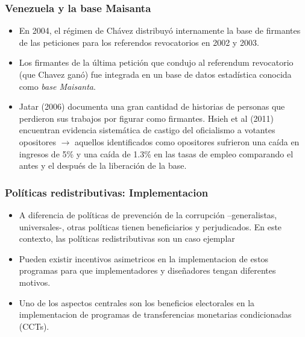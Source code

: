 \documentclass[handout,final,xcolor=dvipsnames]{beamer}
\begin{document}
   \begin{frame}\frametitle{Venezuela y la base Maisanta}
  \begin{itemize}\itemsep 10pt
      \item En 2004, el régimen de Chávez distribuyó internamente la
        base de firmantes de las peticiones para los referendos
        revocatorios en 2002 y 2003.
        \item Los firmantes de la última petición que condujo al
          referendum revocatorio (que Chavez ganó) fue integrada en un
          base de datos estadística conocida como \textit{base
            Maisanta}.
          \item Jatar (2006) documenta una gran cantidad de historias
            de personas que perdieron sus trabajos por figurar como
            firmantes. Hsieh et al (2011) encuentran evidencia
            sistemática de castigo del oficialismo a votantes
            opositores $\longrightarrow$ aquellos identificados como
            opositores sufrieron una caída en ingresos de 5\% y una
            caída de 1.3\% en las tasas de empleo comparando el antes
            y el después de la liberación de la base. 
     \end{itemize}
  \end{frame}



  \begin{frame}\frametitle{Políticas redistributivas: Implementacion}
  \begin{itemize}\itemsep 10pt
  \item A diferencia de políticas de prevención de la corrupción
    --generalistas, universales-, otras políticas tienen beneficiarios
    y perjudicados. En este contexto, las políticas redistributivas
    son un caso ejemplar
    \item Pueden existir incentivos asimetricos en la implementacion
      de estos programas para que implementadores y diseñadores tengan
      diferentes motivos.
      \item Uno de los aspectos centrales son los beneficios
        electorales en la implementacion de programas de
        transferencias monetarias condicionadas (CCTs). 
    \end{itemize}
\end{frame}
\end{document}
